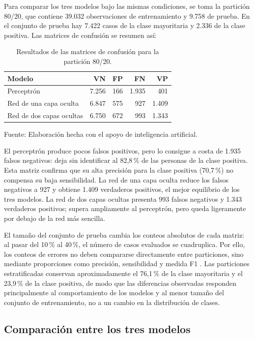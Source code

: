 \documentclass[12pt,letterpaper,oneside]{article}
\newcommand{\fuenteAI}{\par\centering\footnotesize Fuente: Elaboración hecha con el apoyo de inteligencia artificial.}
\begin{document}
Para comparar los tres modelos bajo las mismas condiciones, se toma la partición 80/20, que contiene 39.032 observaciones de entrenamiento y 9.758 de prueba. En el conjunto de prueba hay 7.422 casos de la clase mayoritaria y 2.336 de la clase positiva. Las matrices de confusión se resumen así:

\begin{table}[H]
    \centering
    \caption{Resultados de las matrices de confusión para la partición 80/20.}
    \begin{tabular}{lrrrr}
        \hline
        Modelo & VN & FP & FN & VP \\
        \hline
        Perceptrón & 7.256 & 166 & 1.935 & 401 \\
        Red de una capa oculta & 6.847 & 575 & 927 & 1.409 \\
        Red de dos capas ocultas & 6.750 & 672 & 993 & 1.343 \\
        \hline
    \end{tabular}
    \fuenteAI
\end{table}

El perceptrón produce pocos falsos positivos, pero lo consigue a costa de 1.935 falsos negativos: deja sin identificar al 82,8\,\% de las personas de la clase positiva. Esta matriz confirma que su alta precisión para la clase positiva (70,7\,\%) no compensa su baja sensibilidad. La red de una capa oculta reduce los falsos negativos a 927 y obtiene 1.409 verdaderos positivos, el mejor equilibrio de los tres modelos. La red de dos capas ocultas presenta 993 falsos negativos y 1.343 verdaderos positivos; supera ampliamente al perceptrón, pero queda ligeramente por debajo de la red más sencilla.

El tamaño del conjunto de prueba cambia los conteos absolutos de cada matriz: al pasar del 10\,\% al 40\,\%, el número de casos evaluados se cuadruplica. Por ello, los conteos de errores no deben compararse directamente entre particiones, sino mediante proporciones como precisión, sensibilidad y medida F1 \cite{sklearn-metrics}. Las particiones estratificadas conservan aproximadamente el 76,1\,\% de la clase mayoritaria y el 23,9\,\% de la clase positiva, de modo que las diferencias observadas responden principalmente al comportamiento de los modelos y al menor tamaño del conjunto de entrenamiento, no a un cambio en la distribución de clases.

\subsection{Comparación entre los tres modelos}
\end{document}
